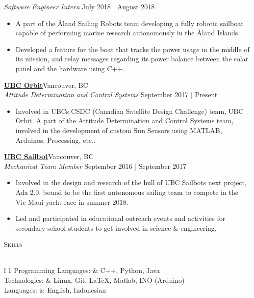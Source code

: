 \documentclass[a4paper]{article}
\newcommand{\lineunder} {
    \vspace*{-8pt} \\
    \hspace*{-18pt} \hrulefill \\
}
\newcommand{\header} [1] {
    {\hspace*{-18pt}\vspace*{6pt} \textsc{#1}}
    \vspace*{-6pt} \lineunder
}
\begin{document}
\textit{Software Engineer Intern} \hfill July 2018 | August 2018\\
\vspace{-1mm}
\begin{itemize} \itemsep 1pt
	\item A part of the Åland Sailing Robots team developing a fully robotic sailboat capable of performing marine research autonomously in the Åland Islands.
	\item Developed a feature for the boat that tracks the power usage in the middle of it\textquotesingle{}s mission, and relay messages regarding its power balance between the solar panel and the hardware using C++.
\end{itemize}
\textbf{\href{https://www.ubcorbit.com/}{UBC Orbit}}\hfill Vancouver, BC\\
\textit{Attitude Determination and Control Systems} \hfill September 2017 | Present\\
\vspace{-1mm}
\begin{itemize} \itemsep 1pt
	\item Involved in UBC\textquotesingle{}s CSDC (Canadian Satellite Design Challenge) team, UBC Orbit. A part of the Attitude Determination and Control Systems team, involved in the development of custom Sun Sensors using MATLAB, Arduinos, Processing, etc..
\end{itemize}
\textbf{\href{https://ubcsailbot.org/}{UBC Sailbot}}\hfill Vancouver, BC\\
\textit{Mechanical Team Member} \hfill September 2016 | September 2017\\
\vspace{-1mm}
\begin{itemize} \itemsep 1pt
	\item Involved in the design and research of the hull of UBC Sailbot\textquotesingle{}s next project, Ada 2.0, bound to be the first autonomous sailing team to compete in the Vic-Maui yacht race in summer 2018.
	\item Led and participated in educational outreach events and activities for secondary school students to get involved in science \& engineering.
\end{itemize}

\header{Skills}
\begin{tabular}{ l 1 }
	Programming Languages:  & C++, Python, Java\\
	Technologies: & Linux, Git, LaTeX, Matlab, INO (Arduino)\\
	Languages: & English, Indonesian \\
\end{tabular}
\vspace{2mm}
\end{document}
